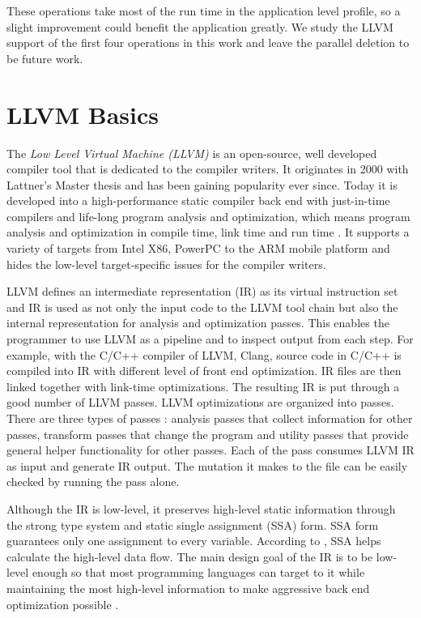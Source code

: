 These operations take most of the run time in the application level profile, so a slight improvement could benefit the application greatly. We study the LLVM support of the first four operations in this work and leave the parallel deletion to be future work.

\section{LLVM Basics}
The \textit{Low Level Virtual Machine (LLVM)} is an open-source, well developed compiler tool that is dedicated to the compiler writers. It originates in 2000 with Lattner's Master thesis \cite{chris_msthesis} and has been gaining popularity ever since. Today it is developed into a high-performance static compiler back end with just-in-time compilers and life-long program analysis and optimization, which means program analysis and optimization in compile time, link time and run time \cite{llvm_ghc, llvm_cgo04}. It supports a variety of targets from Intel X86, PowerPC to the ARM mobile platform and hides the low-level target-specific issues for the compiler writers.

LLVM defines an intermediate representation (IR) as its virtual instruction set and IR is used as not only the input code to the LLVM tool chain but also the internal representation for analysis and optimization passes. This enables the programmer to use LLVM as a pipeline and to inspect output from each step. For example, with the C/C++ compiler of LLVM, Clang, source code in C/C++ is compiled into IR with different level of front end optimization. IR files are then linked together with link-time optimizations. The resulting IR is put through a good number of LLVM passes. LLVM optimizations are organized into passes. There are three types of passes \cite{llvm_pass}: analysis passes that collect information for other passes, transform passes that change the program and utility passes that provide general helper functionality for other passes. Each of the pass consumes LLVM IR as input and generate IR output. The mutation it makes to the file can be easily checked by running the pass alone.

Although the IR is low-level, it preserves high-level static information through the strong type system and static single assignment (SSA) form. SSA form guarantees only one assignment to every variable. According to \cite{cytron1991efficiently}, SSA helps calculate the high-level data flow. The main design goal of the IR is to be low-level enough so that most programming languages can target to it while maintaining the most high-level information to make aggressive back end optimization possible \cite{llvm_ghc}.

